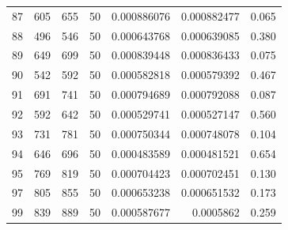 \begin{tabular}{r r r r r r r}
87 & 605 & 655 & 50 & 0.000886076 & 0.000882477 & 0.065 \\
88 & 496 & 546 & 50 & 0.000643768 & 0.000639085 & 0.380 \\
89 & 649 & 699 & 50 & 0.000839448 & 0.000836433 & 0.075 \\
90 & 542 & 592 & 50 & 0.000582818 & 0.000579392 & 0.467 \\
91 & 691 & 741 & 50 & 0.000794689 & 0.000792088 & 0.087 \\
92 & 592 & 642 & 50 & 0.000529741 & 0.000527147 & 0.560 \\
93 & 731 & 781 & 50 & 0.000750344 & 0.000748078 & 0.104 \\
94 & 646 & 696 & 50 & 0.000483589 & 0.000481521 & 0.654 \\
95 & 769 & 819 & 50 & 0.000704423 & 0.000702451 & 0.130 \\
97 & 805 & 855 & 50 & 0.000653238 & 0.000651532 & 0.173 \\
99 & 839 & 889 & 50 & 0.000587677 & 0.0005862 & 0.259 \\
\bottomrule
\end{tabular}
